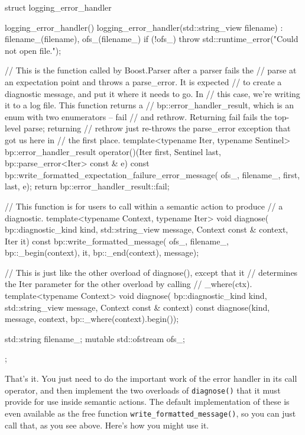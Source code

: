 \begin{code}
struct logging_error_handler
{
    logging_error_handler() {}
    logging_error_handler(std::string_view filename) :
        filename_(filename), ofs_(filename_)
    {
        if (!ofs_)
            throw std::runtime_error("Could not open file.");
    }

    // This is the function called by Boost.Parser after a parser fails the
    // parse at an expectation point and throws a parse_error.  It is expected
    // to create a diagnostic message, and put it where it needs to go.  In
    // this case, we're writing it to a log file.  This function returns a
    // bp::error_handler_result, which is an enum with two enumerators -- fail
    // and rethrow.  Returning fail fails the top-level parse; returning
    // rethrow just re-throws the parse_error exception that got us here in
    // the first place.
    template<typename Iter, typename Sentinel>
    bp::error_handler_result
    operator()(Iter first, Sentinel last, bp::parse_error<Iter> const & e) const
    {
        bp::write_formatted_expectation_failure_error_message(
            ofs_, filename_, first, last, e);
        return bp::error_handler_result::fail;
    }

    // This function is for users to call within a semantic action to produce
    // a diagnostic.
    template<typename Context, typename Iter>
    void diagnose(
        bp::diagnostic_kind kind,
        std::string_view message,
        Context const & context,
        Iter it) const
    {
        bp::write_formatted_message(
            ofs_,
            filename_,
            bp::_begin(context),
            it,
            bp::_end(context),
            message);
    }

    // This is just like the other overload of diagnose(), except that it
    // determines the Iter parameter for the other overload by calling
    // _where(ctx).
    template<typename Context>
    void diagnose(
        bp::diagnostic_kind kind,
        std::string_view message,
        Context const & context) const
    {
        diagnose(kind, message, context, bp::_where(context).begin());
    }

    std::string filename_;
    mutable std::ofstream ofs_;
};
\end{code}

That's it. You just need to do the important work of the error handler in its call operator, and then implement the two overloads of \texttt{diagnose()} that it must provide for use inside semantic actions. The default implementation of these is even available as the free function \texttt{write\_formatted\_message()}, so you can just call that, as you see above. Here's how you might use it.

